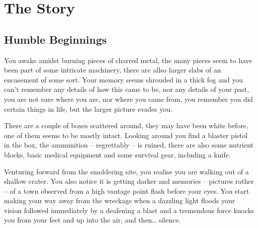 \documentclass[a4paper,10pt]{book}
\begin{document}
\part{The Story}
\chapter{Humble Beginnings}
You awake amidst burning pieces of charred metal, the many pieces
seem to have been part of some intricate machinery, there are allso larger
slabs of an encasement of some sort. Your memory seems shrouded in a thick fog
and you can't remember any details of how this came to be, nor any details of 
your past, you are not sure where you are, nor where you came from, you remember
you did certain things in life, but the larger picture evades you.

There are a couple of boxes scattered around, they may have been white before,
one of them seems to be mostly intact.  Looking around you find a blaster
pistol in the box, the ammunition -- regrettably -- is ruined, there are also
some nutrient blocks, basic medical equipment and some survival gear, including
a knife.

Venturing forward from the smoldering site, you realise you are walking out of
a shallow crater. You also notice it is getting darker and memories -- pictures
rather -- of a town observed from a high vantage point flash before your eyes.
You start making your way away from the wreckage when a dazzling light floods
your vision followed immediately by a deafening a blast and a tremendous force
knocks you from your feet and up into the air, and then\ldots{} silence.
\end{document}
